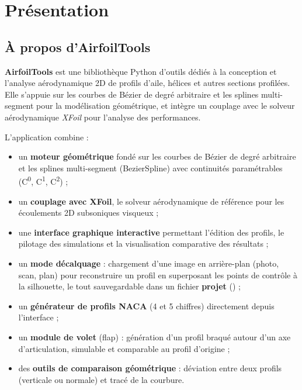 \chapter{Présentation}
\label{chap:introduction}

\section{À propos d'AirfoilTools}

\textbf{AirfoilTools} est une bibliothèque Python d'outils dédiés
à la conception et l'analyse aérodynamique 2D de profils d'aile, hélices et autres sections profilées. 
Elle s'appuie sur les courbes de Bézier de degré arbitraire et 
les splines multi-segment pour la modélisation géométrique, et intègre un couplage avec le solveur aérodynamique \emph{XFoil} 
pour l'analyse des performances.

L'application combine :

\begin{itemize}
    \item un \textbf{moteur géométrique} fondé sur les courbes de
        Bézier de degré arbitraire et les splines multi-segment
        (BezierSpline) avec continuités paramétrables (C\textsuperscript{0},
        C\textsuperscript{1}, C\textsuperscript{2}) ;
    \item un \textbf{couplage avec XFoil}, le solveur
        aérodynamique de référence pour les écoulements 2D
        subsoniques visqueux ;
    \item une \textbf{interface graphique interactive} permettant
        l'édition des profils, le pilotage des simulations et la
        visualisation comparative des résultats ;
    \item un \textbf{mode décalquage} : chargement d'une image en
        arrière-plan (photo, scan, plan) pour reconstruire un profil
        en superposant les points de contrôle à la silhouette, le
        tout sauvegardable dans un fichier \textbf{projet}
        () ;
    \item un \textbf{générateur de profils NACA} (4 et 5 chiffres)
        directement depuis l'interface ;
    \item un \textbf{module de volet} (flap) : génération d'un profil
        braqué autour d'un axe d'articulation, simulable et comparable
        au profil d'origine ;
    \item des \textbf{outils de comparaison géométrique} : déviation
        entre deux profils (verticale ou normale) et tracé de la
        courbure.
\end{itemize}

